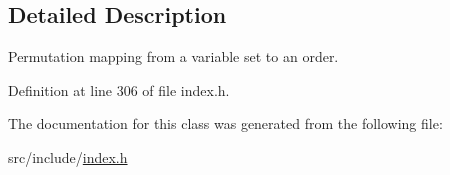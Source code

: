 \subsection{Detailed Description}
Permutation mapping from a variable set to an order. 

Definition at line 306 of file index.\+h.



The documentation for this class was generated from the following file\+:\begin{DoxyCompactItemize}
\item 
src/include/\hyperlink{index_8h}{index.\+h}\end{DoxyCompactItemize}

